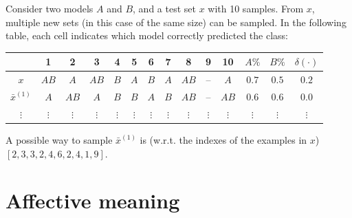\begin{description}
        \begin{example}
            Consider two models $A$ and $B$, and a test set $x$ with 10 samples. From $x$, multiple new sets (in this case of the same size) can be sampled. In the following table, each cell indicates which model correctly predicted the class:
            \begin{center}
                \footnotesize
                \begin{tabular}{ccccccccccc|ccc}
                    \toprule
                                    & 1 & 2 & 3 & 4 & 5 & 6 & 7 & 8 & 9 & 10 & $A\%$ & $B\%$ & $\delta(\cdot)$ \\
                    \midrule
                    $x$             & $AB$ & $A$ & $AB$ & $B$ & $A$ & $B$ & $A$ & $AB$ & -- & $A$ & $0.7$ & $0.5$ & $0.2$ \\
                    $\bar{x}^{(1)}$   & $A$ & $AB$ & $A$ & $B$ & $B$ & $A$ & $B$ & $AB$ & -- & $AB$ & $0.6$ & $0.6$ & $0.0$ \\
                    $\vdots$ & $\vdots$ & $\vdots$ & $\vdots$ & $\vdots$ & $\vdots$ & $\vdots$ & $\vdots$ & $\vdots$ & $\vdots$ & $\vdots$ & $\vdots$ & $\vdots$ & $\vdots$ \\
                    \bottomrule
                \end{tabular}
            \end{center}
            A possible way to sample $\bar{x}^{(1)}$ is (w.r.t. the indexes of the examples in $x$) $[2, 3, 3, 2, 4, 6, 2, 4, 1, 9]$.
        \end{example}
\end{description}



\section{Affective meaning} \label{sec:affective_meaning}

